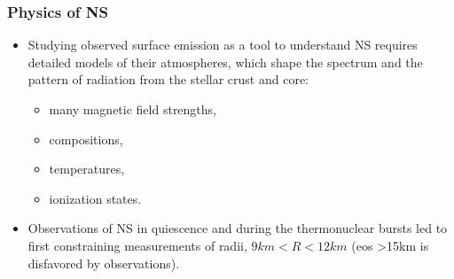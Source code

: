 \begin{frame}
\frametitle{Physics of NS}  
	{\scriptsize 
	  \begin{itemize}
	   \item Studying observed surface emission as a tool to understand NS requires detailed models of their atmospheres, which shape the spectrum and the pattern of radiation from the stellar crust and core:
	   \begin{itemize}
	    \item  many magnetic field strengths,
	    \item compositions,
	    \item temperatures,
	    \item ionization states.
	   \end{itemize}
	   \item Observations of NS in quiescence and during the thermonuclear bursts led to first constraining measurements of radii, $9 km < R <12 km$ (eos >15km is disfavored by observations).
	  \end{itemize}
	}       
\end{frame}

